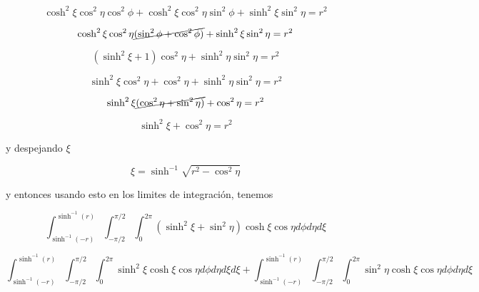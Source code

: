 \documentclass[12pt,a4paper]{article}
\begin{document}
\begin{enumerate}
    \begin{equation*}
        \cosh^2{\xi}\cos^2{\eta}\cos^2{\phi}+ \cosh^2{\xi}\cos^2{\eta}\sin^2{\phi}+ \sinh^2{\xi}\sin^2{\eta} = r^2
    \end{equation*}
    
    \begin{equation*}
        \cosh^2{\xi}\cos^2{\eta}\cancel{(\sin^2{\phi}+\cos^2{\phi})} + \sinh^2{\xi}\sin^2{\eta} = r^2
    \end{equation*}
    
    \begin{equation*}
        (\sinh^2{\xi}+1)\cos^2{\eta}+\sinh^2{\eta}\sin^2{\eta} = r^2
    \end{equation*}
    
    \begin{equation*}
    \sinh^2{\xi}\cos^2{\eta}+\cos^2{\eta}+\sinh^2{\eta}\sin^2{\eta} = r^2
    \end{equation*}
    
    \begin{equation*}
        \sinh^2{\xi}\cancel{(\cos^2{\eta}+\sin^2{\eta})}+\cos^2{\eta} = r^2
    \end{equation*}
    
    \begin{equation*}
        \sinh^2{\xi}+ \cos^2{\eta} = r^2
    \end{equation*}
    
    y despejando $\xi$
    
    \begin{equation*}
        \xi = \sinh^{-1}{\sqrt{r^2-\cos^2{\eta}}}
    \end{equation*}
    
    y entonces usando esto en los limites de integración, tenemos
    
    \begin{equation*}
        \int_{\sinh^{-1}{(-r)}}^{\sinh^{-1}{(r)}}\int_{-\pi /2}^{\pi/2}\int_{0}^{2\pi} (\sinh^2{\xi}+\sin^2{\eta})\cosh{\xi}\cos{\eta} d\phi d\eta d\xi
    \end{equation*}
    
    \begin{equation*}
        \int_{\sinh^{-1}{(-r)}}^{\sinh^{-1}{(r)}}\int_{-\pi /2}^{\pi/2}\int_{0}^{2\pi} \sinh^2{\xi}\cosh{\xi}\cos{\eta} d\phi d\eta d\xi d\xi+\int_{\sinh^{-1}{(-r)}}^{\sinh^{-1}{(r)}}\int_{-\pi /2}^{\pi/2}\int_{0}^{2\pi}\sin^2{\eta}\cosh{\xi}\cos{\eta}d\phi d\eta d\xi
    \end{equation*}
    

\end{enumerate}
\end{document}
